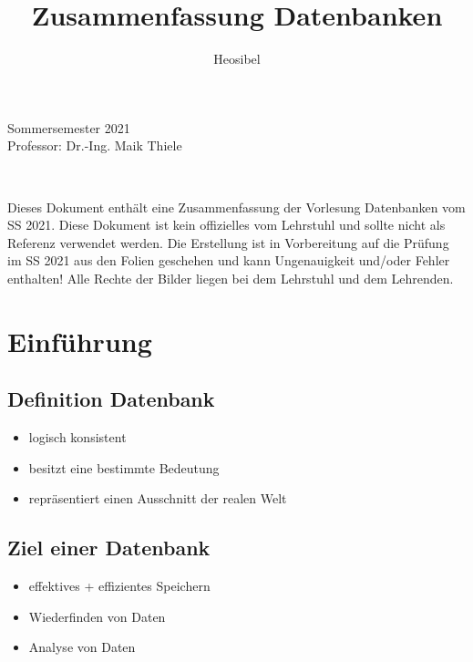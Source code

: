 \documentclass[a4paper]{article}
\title{Zusammenfassung Datenbanken}
\author{Heosibel}
\begin{document}
\maketitle


\begin{center}
    Sommersemester 2021 \\
    Professor: Dr.-Ing. Maik Thiele
\end{center}

\,

\begin{center}
    Dieses Dokument enthält eine Zusammenfassung der Vorlesung Datenbanken vom SS 2021.
    Diese Dokument ist kein offizielles vom Lehrstuhl und sollte nicht als Referenz verwendet werden.
    Die Erstellung ist in Vorbereitung auf die Prüfung im SS 2021 aus den Folien geschehen und kann Ungenauigkeit und/oder Fehler enthalten!
    Alle Rechte der Bilder liegen bei dem Lehrstuhl und dem Lehrenden.
\end{center}


\newpage

\tableofcontents

\newpage

\section{Einführung}

\subsection{Definition Datenbank}
\begin{itemize}
    \item logisch konsistent  
    \item besitzt eine bestimmte Bedeutung
    \item repräsentiert einen Ausschnitt der realen Welt
\end{itemize}

\subsection{Ziel einer Datenbank}
\begin{itemize}
    \item effektives + effizientes Speichern
    \item Wiederfinden von Daten
    \item Analyse von Daten
\end{itemize}
\end{document}
